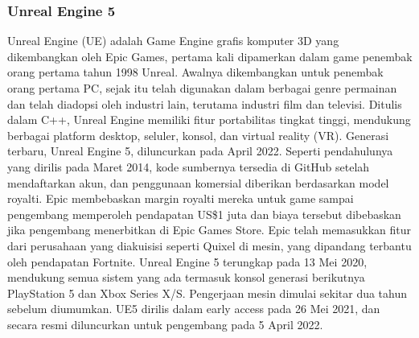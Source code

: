 \subsubsection{Unreal Engine 5}

Unreal Engine (UE) adalah Game Engine grafis komputer 3D yang dikembangkan oleh Epic Games, pertama kali dipamerkan dalam game penembak orang pertama tahun 1998 Unreal. 
Awalnya dikembangkan untuk penembak orang pertama PC, sejak itu telah digunakan dalam berbagai genre permainan dan telah diadopsi oleh industri lain, terutama industri film dan televisi. Ditulis dalam C++, 
Unreal Engine memiliki fitur portabilitas tingkat tinggi, mendukung berbagai platform desktop, seluler, konsol, dan virtual reality (VR).
Generasi terbaru, Unreal Engine 5, diluncurkan pada April 2022. Seperti pendahulunya yang dirilis pada Maret 2014, kode sumbernya tersedia di GitHub setelah mendaftarkan akun, dan penggunaan komersial diberikan 
berdasarkan model royalti. Epic membebaskan margin royalti mereka untuk game sampai pengembang memperoleh pendapatan US\$1 juta dan biaya tersebut dibebaskan jika pengembang menerbitkan di Epic Games Store. Epic telah memasukkan fitur dari perusahaan yang diakuisisi seperti Quixel di mesin, yang dipandang terbantu oleh pendapatan Fortnite.
Unreal Engine 5 terungkap pada 13 Mei 2020, mendukung semua sistem yang ada termasuk konsol generasi berikutnya PlayStation 5 dan Xbox Series X/S.\citep{StattEpicAnnounce} Pengerjaan mesin dimulai sekitar dua 
tahun sebelum diumumkan.\citep{DeanTakahashi} UE5 dirilis dalam early access pada 26 Mei 2021,\citep{EddieMakuch} dan secara resmi diluncurkan untuk pengembang pada 5 April 2022.\citep{UE5Launch}

